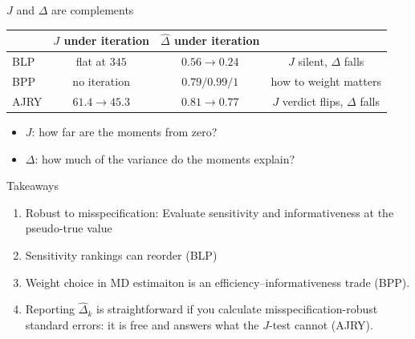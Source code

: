 \documentclass[11pt,aspectratio=169]{beamer}
\begin{document}
\begin{frame}{$J$ and $\Delta$ are complements}
    \centering
    \begin{tabular}{lccc}
        \toprule
             & $J$ under iteration & $\widehat\Delta$ under iteration & \\
        \midrule
        BLP  & flat at $345$    & $0.56\to0.24$ & $J$ silent, $\Delta$ falls \\
        BPP  & no iteration & $0.79/0.99/1$ & how to weight matters \\
        AJRY & $61.4\to45.3$    & $0.81\to0.77$ & $J$ verdict flips, $\Delta$ falls \\
        \bottomrule
    \end{tabular}
    \vspace{1.0em}
    \begin{itemize}\setlength{\itemsep}{0.5em}
        \item $J$: how far are the moments from zero?
        \item $\Delta$: how much of the variance do the moments explain?
    \end{itemize}
\end{frame}

\begin{frame}{Takeaways}
    \begin{enumerate}\setlength{\itemsep}{1.0em}
        \item Robust to misspecification: Evaluate sensitivity and informativeness \alert{at the pseudo-true
              value}
        \item Sensitivity rankings can reorder (BLP) 
        \item Weight choice in MD estimaiton is an efficiency--informativeness trade (BPP).
        \item Reporting $\widehat\Delta_k$ is straightforward if you calculate misspecification-robust standard
              errors: it is free and answers what the $J$-test cannot (AJRY).
    \end{enumerate}
\end{frame}

\appendix
\end{document}
